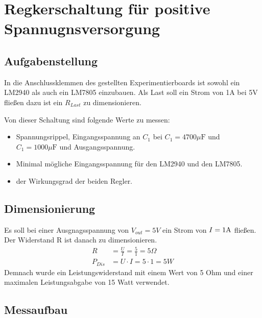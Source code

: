 \section{Regkerschaltung für positive Spannugnsversorgung}
\subsection{Aufgabenstellung}
In die Anschlussklemmen des gestellten Experimentierboards ist sowohl ein LM2940 als auch ein LM7805 einzubauen. Als Last soll ein Strom von 1A bei 5V fließen dazu ist ein $R_{Last}$ zu dimensionieren. 

Von dieser Schaltung sind folgende Werte zu messen:
\begin{itemize}
    \item Spannungsrippel, Eingangsspannung an $C_1$ bei $C_1=4700\mu \text{F}$ und $C_1=1000\mu \text{F}$ und Ausgangsspannung.
    \item Minimal mögliche Eingangsspannung für den LM2940 und den LM7805.
    \item der Wirkungsgrad der beiden Regler.
\end{itemize}
\subsection{Dimensionierung}
Es soll bei einer Ausgnagsspannung von $V_{out} = 5V$ ein Strom von $I=1\rm A$ fließen. Der Widerstand R ist danach zu dimensionieren.
\begin{align}
    R&= \frac{U}{I} = \frac{5}{1} = 5\Omega \\
    P_{Dis} &= U \cdot I = 5\cdot 1 = 5 W
\end{align}
Demnach wurde ein Leistungswiderstand mit einem Wert von 5 Ohm und einer maximalen Leistungsabgabe von 15 Watt verwendet.
\subsection{Messaufbau}


